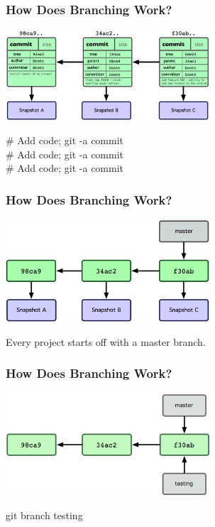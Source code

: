 \begin{frame}
\frametitle{\large How Does Branching Work?}
\begin{center}
\includegraphics[width=0.57\textwidth]{img/branching_images/fig2.png}
\end{center}
\vspace{2mm}
\begin{center}
\# Add code; git -a commit \\
\# Add code; git -a commit \\
\# Add code; git -a commit
\end{center}
\end{frame}
\note{}

\begin{frame}
\frametitle{\large How Does Branching Work?}
\begin{center}
\includegraphics[width=0.57\textwidth]{img/branching_images/fig3.png}
\end{center}
\vspace{2mm}
\begin{center}
Every project starts off with a master branch.
\end{center}
\end{frame}
\note{}

\begin{frame}
\frametitle{\large How Does Branching Work?}
\begin{center}
\includegraphics[width=0.57\textwidth]{img/branching_images/fig4.png}
\end{center}
\vspace{2mm}
\begin{center}
git branch testing
\end{center}
\end{frame}
\note{}

